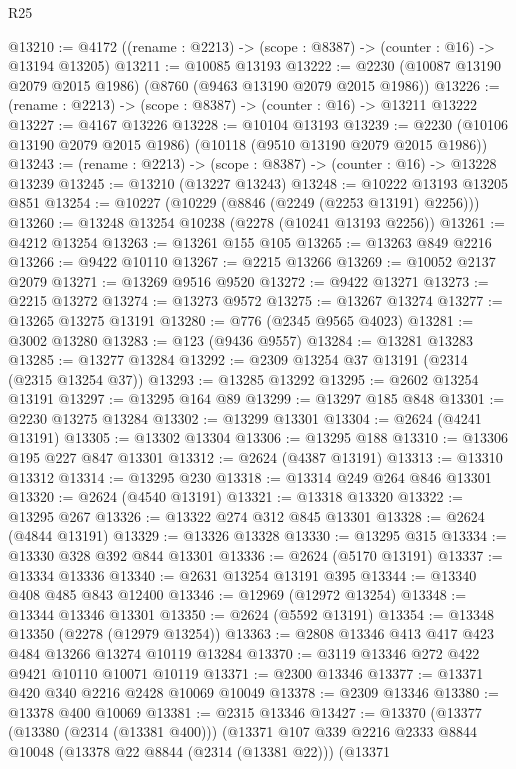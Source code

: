 \begin{lexlean}{R25}
\begin{coremodule}
@13210 := @4172 ((rename : @2213) -> (scope : @8387) -> (counter : @16) -> @13194 @13205)
@13211 := @10085 @13193
@13222 := @2230 (@10087 @13190 @2079 @2015 @1986) (@8760 (@9463 @13190 @2079 @2015 @1986))
@13226 := (rename : @2213) -> (scope : @8387) -> (counter : @16) -> @13211 @13222
@13227 := @4167 @13226
@13228 := @10104 @13193
@13239 := @2230 (@10106 @13190 @2079 @2015 @1986) (@10118 (@9510 @13190 @2079 @2015 @1986))
@13243 := (rename : @2213) -> (scope : @8387) -> (counter : @16) -> @13228 @13239
@13245 := @13210 (@13227 @13243)
@13248 := @10222 @13193 @13205 @851
@13254 := @10227 (@10229 (@8846 (@2249 (@2253 @13191) @2256)))
@13260 := @13248 @13254 @10238 (@2278 (@10241 @13193 @2256))
@13261 := @4212 @13254
@13263 := @13261 @155 @105
@13265 := @13263 @849 @2216
@13266 := @9422 @10110
@13267 := @2215 @13266
@13269 := @10052 @2137 @2079
@13271 := @13269 @9516 @9520
@13272 := @9422 @13271
@13273 := @2215 @13272
@13274 := @13273 @9572
@13275 := @13267 @13274
@13277 := @13265 @13275 @13191
@13280 := @776 (@2345 @9565 @4023)
@13281 := @3002 @13280
@13283 := @123 (@9436 @9557)
@13284 := @13281 @13283
@13285 := @13277 @13284
@13292 := @2309 @13254 @37 @13191 (@2314 (@2315 @13254 @37))
@13293 := @13285 @13292
@13295 := @2602 @13254 @13191
@13297 := @13295 @164 @89
@13299 := @13297 @185 @848
@13301 := @2230 @13275 @13284
@13302 := @13299 @13301
@13304 := @2624 (@4241 @13191)
@13305 := @13302 @13304
@13306 := @13295 @188
@13310 := @13306 @195 @227 @847 @13301
@13312 := @2624 (@4387 @13191)
@13313 := @13310 @13312
@13314 := @13295 @230
@13318 := @13314 @249 @264 @846 @13301
@13320 := @2624 (@4540 @13191)
@13321 := @13318 @13320
@13322 := @13295 @267
@13326 := @13322 @274 @312 @845 @13301
@13328 := @2624 (@4844 @13191)
@13329 := @13326 @13328
@13330 := @13295 @315
@13334 := @13330 @328 @392 @844 @13301
@13336 := @2624 (@5170 @13191)
@13337 := @13334 @13336
@13340 := @2631 @13254 @13191 @395
@13344 := @13340 @408 @485 @843 @12400
@13346 := @12969 (@12972 @13254)
@13348 := @13344 @13346 @13301
@13350 := @2624 (@5592 @13191)
@13354 := @13348 @13350 (@2278 (@12979 @13254))
@13363 := @2808 @13346 @413 @417 @423 @484 @13266 @13274 @10119 @13284
@13370 := @3119 @13346 @272 @422 @9421 @10110 @10071 @10119
@13371 := @2300 @13346
@13377 := @13371 @420 @340 @2216 @2428 @10069 @10049
@13378 := @2309 @13346
@13380 := @13378 @400 @10069
@13381 := @2315 @13346
@13427 := @13370
    (@13377
      (@13380 (@2314 (@13381 @400)))
      (@13371
        @107
        @339
        @2216
        @2333
        @8844
        @10048
        (@13378 @22 @8844 (@2314 (@13381 @22)))
        (@13371

\end{coremodule}
\end{lexlean}
